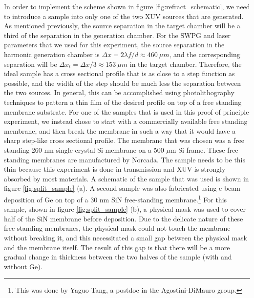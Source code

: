 In order to implement the scheme shown in figure \ref{fig:refract_schematic}, we need to introduce a sample into only one of the two XUV sources that are generated.  As mentioned previously, the source separation in the target chamber will be a third of the separation in the generation chamber. For the SWPG and laser parameters that we used for this experiment, the source separation in the harmonic generation chamber is $\Delta x=2\lambda f/d\approx460\:\mu m$, and the corresponding separation will be $\Delta x_t = \Delta x/3\approx153\: \mu m$ in the target chamber.  Therefore, the ideal sample has a cross sectional profile that is as close to a step function as possible, and the width of the step should be much less the separation between the two sources.  In general, this can be accomplished using photolithography techniques to pattern a thin film of the desired profile on top of a free standing membrane substrate.  For one of the samples that is used in this proof of principle experiment, we instead chose to start with a commercially available free standing membrane, and then break the membrane in such a way that it would have a sharp step-like cross sectional profile.  The membrane that was chosen was a free standing 260 nm single crystal Si membrane on a 500 $\mu$m Si frame.  These free standing membranes are manufactured by Norcada.  The sample needs to be this thin because this experiment is done in transmission and XUV is strongly absorbed by most materials. A schematic of the sample that was used is shown in figure \ref{fig:split_sample} (a).  A second sample was also fabricated using e-beam deposition of Ge on top of a 30 nm SiN free-standing membrane.\footnote{This was done by Yaguo Tang, a postdoc in the Agostini-DiMauro group.}  For this sample, shown in figure \ref{fig:split_sample} (b), a physical mask was used to cover half of the SiN membrane before deposition.  Due to the delicate nature of these free-standing membranes, the physical mask could not touch the membrane without breaking it, and this necessitated a small gap between the physical mask and the membrane itself.  The result of this gap is that there will be a more gradual change in thickness between the two halves of the sample (with and without Ge).

